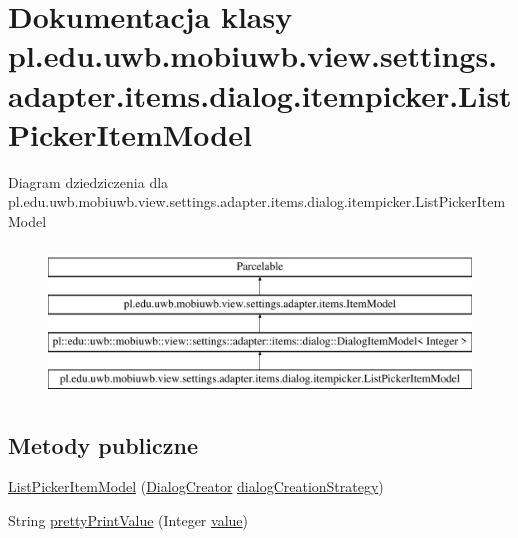 \hypertarget{classpl_1_1edu_1_1uwb_1_1mobiuwb_1_1view_1_1settings_1_1adapter_1_1items_1_1dialog_1_1itempicker_1_1_list_picker_item_model}{}\section{Dokumentacja klasy pl.\+edu.\+uwb.\+mobiuwb.\+view.\+settings.\+adapter.\+items.\+dialog.\+itempicker.\+List\+Picker\+Item\+Model}
\label{classpl_1_1edu_1_1uwb_1_1mobiuwb_1_1view_1_1settings_1_1adapter_1_1items_1_1dialog_1_1itempicker_1_1_list_picker_item_model}
Diagram dziedziczenia dla pl.\+edu.\+uwb.\+mobiuwb.\+view.\+settings.\+adapter.\+items.\+dialog.\+itempicker.\+List\+Picker\+Item\+Model\begin{figure}[H]
\begin{center}
\leavevmode
\includegraphics[height=4.000000cm]{classpl_1_1edu_1_1uwb_1_1mobiuwb_1_1view_1_1settings_1_1adapter_1_1items_1_1dialog_1_1itempicker_1_1_list_picker_item_model}
\end{center}
\end{figure}
\subsection*{Metody publiczne}
\begin{DoxyCompactItemize}
\item 
\hyperlink{classpl_1_1edu_1_1uwb_1_1mobiuwb_1_1view_1_1settings_1_1adapter_1_1items_1_1dialog_1_1itempicker_1_1_list_picker_item_model_a13cf6b4a6fb09023549fb88c140a7c92}{List\+Picker\+Item\+Model} (\hyperlink{classpl_1_1edu_1_1uwb_1_1mobiuwb_1_1controls_1_1dialogs_1_1_dialog_creator}{Dialog\+Creator} \hyperlink{classpl_1_1edu_1_1uwb_1_1mobiuwb_1_1view_1_1settings_1_1adapter_1_1items_1_1dialog_1_1_dialog_item_model_a69815392e79418b2ef8dec9eb184be44}{dialog\+Creation\+Strategy})
\item 
String \hyperlink{classpl_1_1edu_1_1uwb_1_1mobiuwb_1_1view_1_1settings_1_1adapter_1_1items_1_1dialog_1_1itempicker_1_1_list_picker_item_model_ab8bb8c7aef7865178a573d8e93776e20}{pretty\+Print\+Value} (Integer \hyperlink{classpl_1_1edu_1_1uwb_1_1mobiuwb_1_1view_1_1settings_1_1adapter_1_1items_1_1dialog_1_1_dialog_item_model_a6fc8d7f0a0759f12346fdd34666aaf39}{value})
\end{DoxyCompactItemize}
